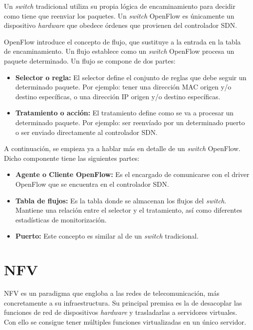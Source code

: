 Un \textit{switch} tradicional utiliza su propia lógica de encaminamiento para decidir como tiene que reenviar los paquetes. Un \textit{switch} OpenFlow es únicamente un dispositivo \textit{hardware} que obedece órdenes que provienen del controlador \ac{SDN}.

OpenFlow introduce el concepto de flujo, que sustituye a la entrada en la tabla de encaminamiento. Un flujo establece como un \textit{switch} OpenFlow procesa un paquete determinado. Un flujo se compone de dos partes:

\begin{itemize}
	\item \textbf{Selector o regla:} El selector define el conjunto de reglas que debe seguir un determinado paquete. Por ejemplo: tener una dirección MAC origen y/o destino específicas, o una dirección \ac{IP} origen y/o destino específicas. 
	
	\item \textbf{Tratamiento o acción:} El tratamiento define como se va a procesar un determinado paquete. Por ejemplo: ser reenvíado por un determinado puerto o ser enviado directamente al controlador \ac{SDN}.
\end{itemize}
	
A continuación, se empieza ya a hablar más en detalle de un \textit{switch} OpenFlow. Dicho componente tiene las siguientes partes:

\begin{itemize}
	\item \textbf{Agente o Cliente OpenFlow:} Es el encargado de comunicarse con el driver OpenFlow que se encuentra en el controlador \ac{SDN}.
	
	\item \textbf{Tabla de flujos:} Es la tabla donde se almacenan los flujos del \textit{switch}. Mantiene una relación entre el selector y el tratamiento, así como diferentes estadísticas de monitorización.
	
	\item \textbf{Puerto:} Este concepto es similar al de un \textit{switch} tradicional.
\end{itemize}

\section{NFV}
\label{sec:nfv}

\ac{NFV} es un paradigma que engloba a las redes de telecomunicación, más concretamente a su infraestructura. Su principal premisa es la de desacoplar las funciones de red de dispositivos \textit{hardware} y trasladarlas a servidores virtuales. Con ello se consigue tener múltiples funciones virtualizadas en un único servidor.\cite{nfvbib}

